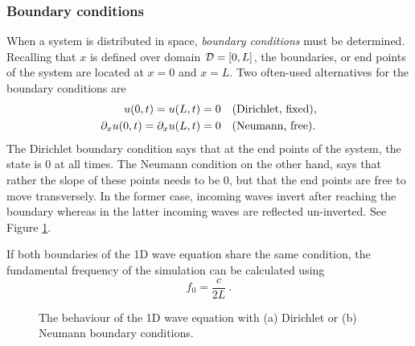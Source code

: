 \subsubsection{Boundary conditions}
When a system is distributed in space, \textit{boundary conditions} must be determined. Recalling that $x$ is defined over domain $\mathcal{D} = [0, L]$, the boundaries, or end points of the system are located at $x=0$ and $x=L$. Two often-used alternatives for the boundary conditions are
%
\begin{subequations}\label{eq:boundaryCond1DWave}
    \begin{align}
        u(0, t) = u(L, t) &= 0\quad \text{(Dirichlet, fixed)},\label{eq:contDirichlet}\\
        \partial_x u(0, t) = \partial_x u(L, t) &= 0\quad \text{(Neumann, free)}.\label{eq:contNeumann}
    \end{align}
\end{subequations}
%
The Dirichlet boundary condition says that at the end points of the system, the state is 0 at all times. The Neumann condition on the other hand, says that rather the slope of these points needs to be 0, but that the end points are free to move transversely. In the former case, incoming waves invert after reaching the boundary whereas in the latter incoming waves are reflected un-inverted. See Figure \ref{fig:boundaryCondsCont}.

If both boundaries of the 1D wave equation share the same condition, the fundamental frequency of the simulation can be calculated using 
\begin{equation}\label{eq:fundamentalFreq}
    f_0 = \frac{c}{2L}\ .
\end{equation}

\begin{figure}[t]
    \centering
    \hspace{0.06\textwidth}
    \caption{The behaviour of the 1D wave equation with (a) Dirichlet or (b) Neumann boundary conditions.\label{fig:boundaryCondsCont}}
\end{figure}

